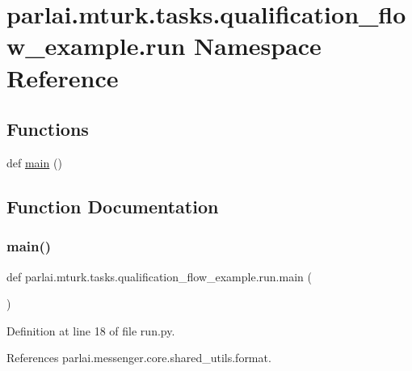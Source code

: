 \hypertarget{namespaceparlai_1_1mturk_1_1tasks_1_1qualification__flow__example_1_1run}{}\section{parlai.\+mturk.\+tasks.\+qualification\+\_\+flow\+\_\+example.\+run Namespace Reference}
\label{namespaceparlai_1_1mturk_1_1tasks_1_1qualification__flow__example_1_1run}
\subsection*{Functions}
\begin{DoxyCompactItemize}
\item 
def \hyperlink{namespaceparlai_1_1mturk_1_1tasks_1_1qualification__flow__example_1_1run_a4bca4106989cf4085b207d8e5c0e66ab}{main} ()
\end{DoxyCompactItemize}


\subsection{Function Documentation}
\mbox{\label{namespaceparlai_1_1mturk_1_1tasks_1_1qualification__flow__example_1_1run_a4bca4106989cf4085b207d8e5c0e66ab}} 
\subsubsection{\texorpdfstring{main()}{main()}}
{\footnotesize\ttfamily def parlai.\+mturk.\+tasks.\+qualification\+\_\+flow\+\_\+example.\+run.\+main (\begin{DoxyParamCaption}{ }\end{DoxyParamCaption})}



Definition at line 18 of file run.\+py.



References parlai.\+messenger.\+core.\+shared\+\_\+utils.\+format.

